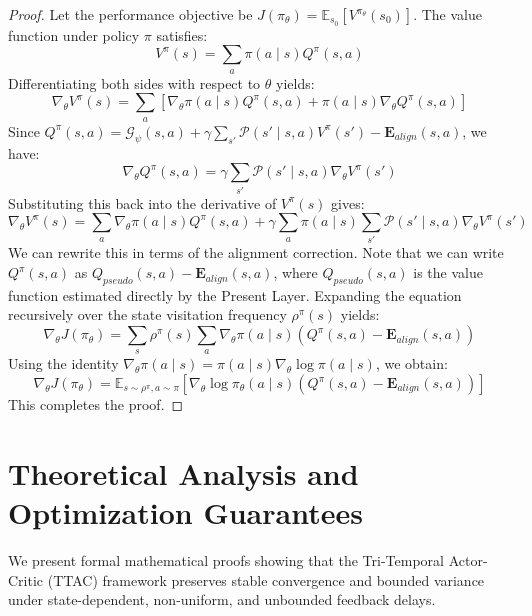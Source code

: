 \documentclass[manuscript, screen, review]{jair}
\begin{document}
\begin{proof}
Let the performance objective be $J(\pi_\theta) = \mathbb{E}_{s_0} [V^{\pi_\theta}(s_0)]$. The value function under policy $\pi$ satisfies:
\begin{equation*}
    V^\pi(s) = \sum_a \pi(a \mid s) Q^\pi(s, a)
\end{equation*}
Differentiating both sides with respect to $\theta$ yields:
\begin{equation*}
    \nabla_\theta V^\pi(s) = \sum_a \left[ \nabla_\theta \pi(a \mid s) Q^\pi(s, a) + \pi(a \mid s) \nabla_\theta Q^\pi(s, a) \right]
\end{equation*}
Since $Q^\pi(s, a) = \mathcal{G}_\psi(s, a) + \gamma \sum_{s'} \mathcal{P}(s' \mid s, a) V^\pi(s') - \mathbf{E}_{align}(s, a)$, we have:
\begin{equation*}
    \nabla_\theta Q^\pi(s, a) = \gamma \sum_{s'} \mathcal{P}(s' \mid s, a) \nabla_\theta V^\pi(s')
\end{equation*}
Substituting this back into the derivative of $V^\pi(s)$ gives:
\begin{equation*}
    \nabla_\theta V^\pi(s) = \sum_a \nabla_\theta \pi(a \mid s) Q^\pi(s, a) + \gamma \sum_a \pi(a \mid s) \sum_{s'} \mathcal{P}(s' \mid s, a) \nabla_\theta V^\pi(s')
\end{equation*}
We can rewrite this in terms of the alignment correction. Note that we can write $Q^\pi(s, a)$ as $Q_{pseudo}(s, a) - \mathbf{E}_{align}(s, a)$, where $Q_{pseudo}(s, a)$ is the value function estimated directly by the Present Layer. Expanding the equation recursively over the state visitation frequency $\rho^\pi(s)$ yields:
\begin{equation*}
    \nabla_\theta J(\pi_\theta) = \sum_s \rho^\pi(s) \sum_a \nabla_\theta \pi(a \mid s) \left( Q^\pi(s, a) - \mathbf{E}_{align}(s, a) \right)
\end{equation*}
Using the identity $\nabla_\theta \pi(a \mid s) = \pi(a \mid s) \nabla_\theta \log \pi(a \mid s)$, we obtain:
\begin{equation*}
    \nabla_\theta J(\pi_\theta) = \mathbb{E}_{s \sim \rho^\pi, a \sim \pi} \left[ \nabla_\theta \log \pi_\theta(a \mid s) \left( Q^\pi(s, a) - \mathbf{E}_{align}(s, a) \right) \right]
\end{equation*}
This completes the proof.
\end{proof}

\section{Theoretical Analysis and Optimization Guarantees}\label{sec:theory}
We present formal mathematical proofs showing that the Tri-Temporal Actor-Critic (TTAC) framework preserves stable convergence and bounded variance under state-dependent, non-uniform, and unbounded feedback delays.
\end{document}

